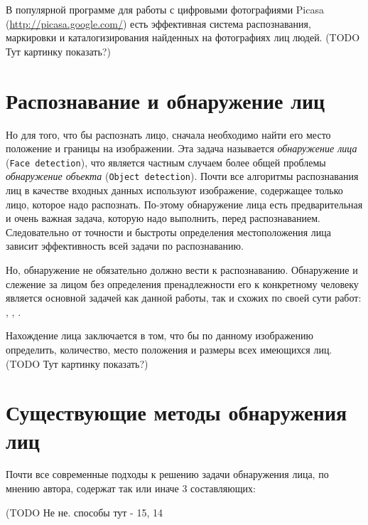 \documentclass[12pt]{report}
\begin{document}
В популярной программе для работы с цифровыми фотографиями Picasa (\url{http://picasa.google.com/}) есть эффективная система распознавания, маркировки и каталогизирования найденных на фотографиях лиц людей. 
(TODO Тут картинку показать?)

\section{Распознавание и обнаружение лиц}

Но для того, что бы распознать лицо, сначала необходимо найти его место положение и границы на изображении. Эта задача называется \emph{обнаружение лица} (\texttt{Face detection}), что является частным случаем более общей проблемы \emph{обнаружение объекта} (\texttt{Object detection}). Почти все алгоритмы распознавания лиц в качестве входных данных используют изображение, содержащее только лицо, которое надо распознать. По-этому обнаружение лица есть предварительная и очень важная задача, которую надо выполнить, перед распознаванием. Следовательно от точности и быстроты определения местоположения лица зависит эффективность всей задачи по распознаванию. 

Но, обнаружение не обязательно должно вести к распознаванию. Обнаружение и слежение за лицом без определения пренадлежности его к конкретному человеку является основной задачей как данной работы, так и схожих по своей сути работ: \citep{capi2010vision}, \citep{luo2007face}, \citep{saxena2008real}.

Нахождение лица заключается в том, что бы по данному изображению определить, количество, место положения и размеры всех имеющихся лиц. \citep{liu2010automatically} (TODO Тут картинку показать?)

\section{Существующие методы обнаружения лиц}


Почти все современные подходы к решению задачи обнаружения лица, по мнению автора, содержат так или иначе 3 составляющих:

(TODO Не не. способы тут - 15, 14
\end{document}
